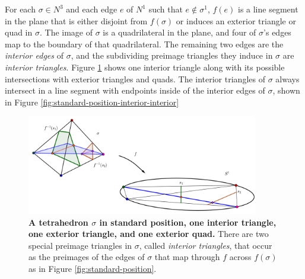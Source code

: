 For each $\sigma\in N^3$ and each edge $e$ of $N^1$ such that $e\notin\sigma^1$, $f(e)$ is a line segment in the plane that is either disjoint from $f(\sigma)$ or induces an exterior triangle or quad in $\sigma$.
The image of $\sigma$ is a quadrilateral in the plane, and four of $\sigma$'s edges map to the boundary of that quadrilateral.
The remaining two edges are the \emph{interior edges} of $\sigma$, and the subdividing preimage triangles they induce in $\sigma$ are \emph{interior triangles}.
Figure \ref{fig:standard-position-interior-exterior} shows one interior triangle along with its possible intersections with exterior triangles and quads.
The interior triangles of $\sigma$ always intersect in a line segment with endpoints inside of the interior edges of $\sigma$, shown in Figure \ref{fig:standard-position-interior-interior}

\begin{figure}[h!]
	\centering
	\includegraphics[width=0.9\textwidth]{figures/standard-position-interior-exterior.png}
	\caption{
		\textbf{A tetrahedron $\sigma$ in standard position, one interior triangle, one exterior triangle, and one exterior quad.}
		There are two special preimage triangles in $\sigma$, called \emph{interior triangles}, that occur as the preimages of the edges of $\sigma$ that map through $f$ across $f(\sigma)$ as in Figure \ref{fig:standard-position}.
	}
	\label{fig:standard-position-interior-exterior}
\end{figure}

